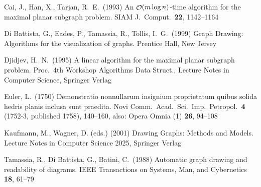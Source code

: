 \documentclass[runningheads]{cl2emult}
\begin{document}
\begin{thebibliography}{7}
%

 Cai, J., Han, X., Tarjan, R.~E.\ (1993)
An $\mathop{\cal O}(m\log n)$-time algorithm for the maximal planar subgraph
problem.
SIAM J.\ Comput.\ {\bf22}, 1142--1164

 Di Battista, G., Eades, P., Tamassia, R., Tollis,
  I.~G.\ (1999)
Graph Drawing: Algorithms for the visualization of graphs.
Prentice Hall, New Jersey

 Djidjev, H.~N.\ (1995)
A linear algorithm for the maximal planar subgraph problem.
Proc.\ 4th Workshop Algorithms Data Struct., 
Lecture Notes in Computer Science, Springer Verlag

 Euler, L.\ (1750)
Demonstratio nonnullarum insignium proprietatum quibus solida hedris
planis inclusa sunt praedita.
Novi Comm.\ Acad.\ Sci.\ Imp.\ Petropol.\ {\bf4} (1752-3, published
1758), 140--160, also: Opera Omnia (1) {\bf26}, 94--108

 Kaufmann, M., Wagner, D. (eds.) (2001)
Drawing Graphs: Methods and Models.
Lecture Notes in Computer Science 2025, Springer Verlag

 Tamassia, R., Di Battista, G., Batini, C.\ (1988)
Automatic graph drawing and readability of diagrams.
IEEE Transactions on Systems, Man, and Cybernetics {\bf18}, 61--79

\end{thebibliography}

\clearpage
{}
\flushbottom
\printindex
\end{document}
